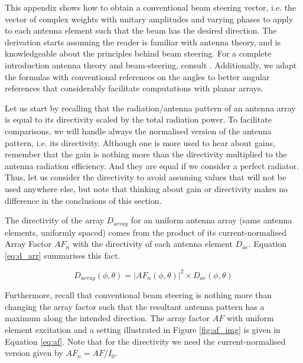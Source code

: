 \label{sec:beam_steering}

This appendix shows how to obtain a conventional beam steering vector, i.e. the vector of complex weights with unitary amplitudes and varying phases to apply to each antenna element such that the beam has the desired direction. The derivation starts assuming the reader is familiar with antenna theory, and is knowledgeable about the principles behind beam steering. For a complete introduction antenna theory and beam-steering, consult \cite{balanis_antennas}. Additionally, we adapt the formulas with conventional references on the angles to better angular references that considerably facilitate computations with planar arrays.

Let us start by recalling that the radiation/antenna pattern of an antenna array is equal to its directivity scaled by the total radiation power. To facilitate comparisons, we will handle always the normalised version of the antenna pattern, i.e. its directivity. Although one is more used to hear about gains, remember that the gain is nothing more than the directivity multiplied to the antenna radiation efficiency. And they are equal if we consider a perfect radiator. Thus, let us consider the directivity to avoid assuming values that will not be used anywhere else, but note that thinking about gain or directivity makes no difference in the conclusions of this section.

The directivity of the array $D_{array}$ for an uniform antenna array (same antenna elements, uniformly spaced) comes from the product of its current-normalised Array Factor $AF_n$ with the directivity of each antenna element $D_{ae}$. Equation \eqref{eq:d_arr} summarises this fact.

\begin{equation} \label{eq:d_arr}
    D_{array}(\phi, \theta) = \left|AF_n(\phi, \theta)\right|^2 \times D_{ae}(\phi, \theta)
\end{equation}

Furthermore, recall that conventional beam steering is nothing more than changing the array factor such that the resultant antenna pattern has a maximum along the intended direction. The array factor $AF$ with uniform element excitation and a setting illustrated in Figure \ref{fig:af_img} is given in Equation \eqref{eq:af}. Note that for the directivity we need the current-normalised version given by $AF_n = AF / I_0$.



